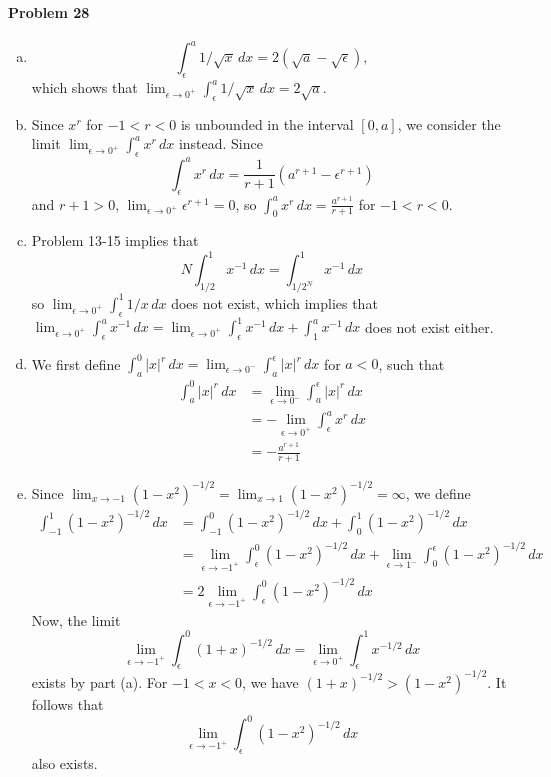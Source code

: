 \documentclass{article}
\begin{document}
\paragraph{Problem 28}
\begin{enumerate}[(a)]
  \item \[
      \int_{\epsilon}^a 1/\sqrt{x} \,dx = 2(\sqrt{a} - \sqrt{\epsilon}),
    \] which shows that $\lim_{\epsilon \to 0^+} \int_{\epsilon}^a 1/\sqrt{x}
    \,dx = 2\sqrt{a}$.
  \item Since $x^r$ for $-1 < r < 0$ is unbounded in the interval $[0, a]$, we
    consider the limit $\lim_{\epsilon \to 0^+} \int_{\epsilon}^a x^r \,dx$
    instead. Since \[
      \int_{\epsilon}^a x^r \,dx = \frac{1}{r + 1}(a^{r + 1} -
      \epsilon^{r + 1})
    \] and $r + 1 > 0$, $\lim_{\epsilon \to 0^+} \epsilon^{r + 1} = 0$, so
    $\int_0^a x^r \,dx = \frac{a^{r + 1}}{r + 1}$ for $-1 < r < 0$.
  \item Problem 13-15 implies that \[
      N\int_{1/2}^1 x^{-1} \,dx = \int_{1/2^N}^1 x^{-1} \,dx
    \] so $\lim_{\epsilon \to 0^+} \int_{\epsilon}^1 1/x \,dx$ does not exist,
    which implies that $\lim_{\epsilon \to 0^+} \int_{\epsilon}^a x^{-1} \,dx =
    \lim_{\epsilon \to 0^+} \int_{\epsilon}^1 x^{-1} \,dx + \int_1^a x^{-1}
    \,dx$ does not exist either.
  \item We first define $\int_a^0 |x|^r \,dx =
    \lim_{\epsilon \to 0^-} \int_a^{\epsilon} |x|^r \,dx$ for $a < 0$, such
    that
    \begin{align*}
      \int_a^0 |x|^r \,dx
      &= \lim_{\epsilon \to 0^-} \int_a^{\epsilon} |x|^r \,dx \\
      &= -\lim_{\epsilon \to 0^+} \int_{\epsilon}^a x^r \,dx \\
      &= -\frac{a^{r + 1}}{r + 1}
    \end{align*}
  \item Since $\lim_{x \to -1} (1 - x^2)^{-1/2} = \lim_{x \to 1}
    (1 - x^2)^{-1/2} = \infty$, we define
    \begin{align*}
      \int_{-1}^1 (1 - x^2)^{-1/2} \,dx
      &= \int_{-1}^0 (1 - x^2)^{-1/2} \,dx + \int_0^1 (1 - x^2)^{-1/2} \,dx \\
      &= \lim_{\epsilon \to -1^+} \int_{\epsilon}^0 (1 - x^2)^{-1/2} \,dx
      + \lim_{\epsilon \to 1^-} \int_0^{\epsilon} (1 - x^2)^{-1/2} \,dx \\
      &= 2\lim_{\epsilon \to -1^+} \int_{\epsilon}^0 (1 - x^2)^{-1/2} \,dx
    \end{align*}
    Now, the limit \[
      \lim_{\epsilon \to -1^+} \int_{\epsilon}^0 (1 + x)^{-1/2} \,dx
      = \lim_{\epsilon \to 0^+} \int_{\epsilon}^1 x^{-1/2} \,dx
    \] exists by part (a). For $-1 < x < 0$, we have $(1 + x)^{-1/2} >
    (1 - x^2)^{-1/2}$. It follows that \[
      \lim_{\epsilon \to -1^+} \int_{\epsilon}^0 (1 - x^2)^{-1/2} \,dx
    \] also exists.
\end{enumerate}
\end{document}
